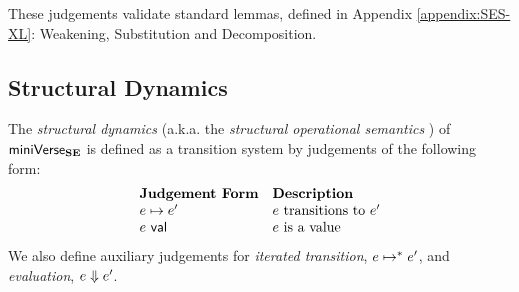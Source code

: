 

These judgements validate standard lemmas, defined in Appendix \ref{appendix:SES-XL}: Weakening, Substitution and Decomposition.

\subsection{Structural Dynamics}\label{sec:dynamics-U}
The \emph{structural dynamics} (a.k.a. the \emph{structural operational semantics} \cite{DBLP:journals/jlp/Plotkin04a}) of $\mathsf{miniVerse}_\textbf{SE}$ is defined as a transition system by judgements of the following form:
\[\begin{array}{ll}
\textbf{Judgement Form} & \textbf{Description}\\
e \mapsto e' & \text{$e$ transitions to $e'$}\\
e~\mathsf{val} & \text{$e$ is a value}
\end{array}\]
We also define auxiliary judgements for \emph{iterated transition}, $e \mapsto^{*} e'$, and \emph{evaluation}, $e \Downarrow e'$.

